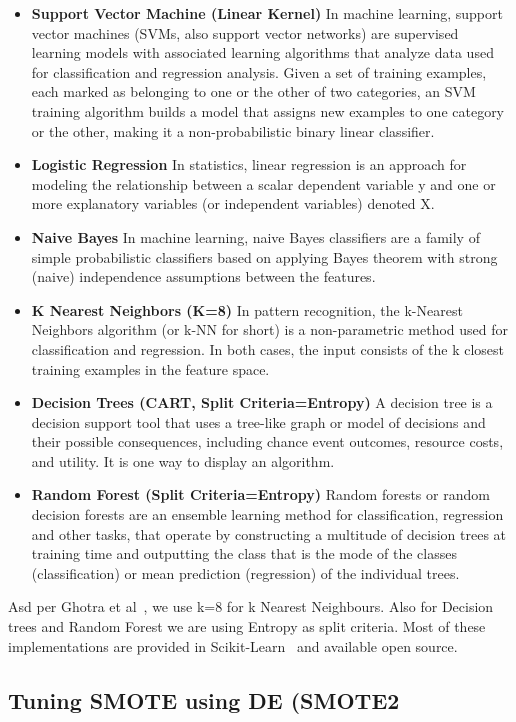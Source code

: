 \documentclass[sigconf]{acmart}
\newcommand{\bi}{\begin{itemize}[leftmargin=0.4cm]}
\newcommand{\ei}{\end{itemize}}
\theoremstyle{break}
\begin{document}
\bi
 \item \textbf{Support Vector Machine (Linear Kernel)}
 In machine learning, support vector machines (SVMs, also support vector networks) are supervised learning models with associated learning algorithms that analyze data used for classification and regression analysis. Given a set of training examples, each marked as belonging to one or the other of two categories, an SVM training algorithm builds a model that assigns new examples to one category or the other, making it a non-probabilistic binary linear classifier.
 \item \textbf{Logistic Regression}
 In statistics, linear regression is an approach for modeling the relationship between a scalar dependent variable y and one or more explanatory variables (or independent variables) denoted X.
 \item \textbf{Naive Bayes}
 In machine learning, naive Bayes classifiers are a family of simple probabilistic classifiers based on applying Bayes theorem with strong (naive) independence assumptions between the features.
 \item \textbf{K Nearest Neighbors (K=8)}
 In pattern recognition, the k-Nearest Neighbors algorithm (or k-NN for short) is a non-parametric method used for classification and regression. In both cases, the input consists of the k closest training examples in the feature space.
 \item \textbf{Decision Trees (CART, Split Criteria=Entropy)}
 A decision tree is a decision support tool that uses a tree-like graph or model of decisions and their possible consequences, including chance event outcomes, resource costs, and utility. It is one way to display an algorithm.
 \item \textbf{Random Forest (Split Criteria=Entropy)}
 Random forests or random decision forests are an ensemble learning method for classification, regression and other tasks, that operate by constructing a multitude of decision trees at training time and outputting the class that is the mode of the classes (classification) or mean prediction (regression) of the individual trees. 
\ei

Asd per Ghotra et al~\cite{ghotra2015revisiting}, we use k=8 for k Nearest Neighbours. Also for Decision trees and Random Forest we are using Entropy as split criteria. Most of these implementations are provided in Scikit-Learn~\cite{pedregosa2011scikit} and available open source.

\subsection{\textbf{Tuning SMOTE using DE (SMOTE2}}
\label{sect:tuning}
\end{document}
